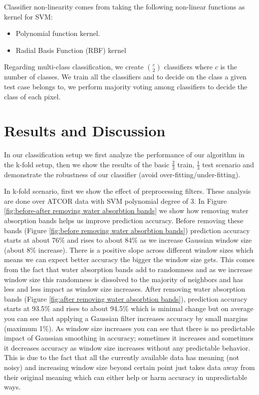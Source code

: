 \documentclass[remotesensing,article,accept,moreauthors,pdftex,12pt,a4paper]{mdpi}
\begin{document}
Classifier non-linearity comes from taking the following non-linear functions as kernel for SVM: 

\begin{itemize}
\item Polynomial function kernel.
\item Radial Basis Function (RBF) kernel
\end{itemize}

Regarding multi-class classification, we create $\binom{c}{2}$ classifiers where $c$ is the number of classes. 
We train all the classifiers and to decide on the class a given test case belongs to, we perform majority voting among classifiers to decide the class of each pixel. 








\section{Results and Discussion}

In our classification setup we first analyze the performance of our algorithm in the k-fold setup, then we show the results of the basic $\frac{2}{3}$ train, $\frac{1}{3}$ test scenario and demonstrate the robustness of our classifier (avoid over-fitting/under-fitting).



In k-fold scenario, first we show the effect of preprocessing filters. 
These analysis are done over ATCOR data with SVM polynomial degree of 3. 
In Figure \ref{fig:before-after removing water absorbtion bands} we show how removing water absorption bands helps us improve prediction accuracy. 
Before removing these bands (Figure \ref{fig:before removing water absorbtion bands}) prediction accuracy starts at about 76\% and rises to about 84\% as we increase Gaussian window size (about 8\% increase). 
There is a positive slope across different window sizes which means we can expect better accuracy the bigger the window size gets. 
This comes from the fact that water absorption bands add to randomness and as we increase window size this randomness is dissolved to the majority of neighbors and has less and less impact as window size increases. 
After removing water absorption bands (Figure \ref{fig:after removing water absorbtion bands}), prediction accuracy starts at 93.5\% and rises to about 94.5\% which is minimal change but on average you can see that applying a Gaussian filter increases accuracy by small margins (maximum 1\%). 
As window size increases you can see that there is no predictable impact of Gaussian smoothing in accuracy; 
sometimes it increases and sometimes it decreases accuracy as window size increases without any predictable behavior. 
This is due to the fact that all the currently available data has meaning (not noisy) and increasing window size beyond certain point just takes data away from their original meaning which can either help or harm accuracy in unpredictable ways. 
\end{document}
